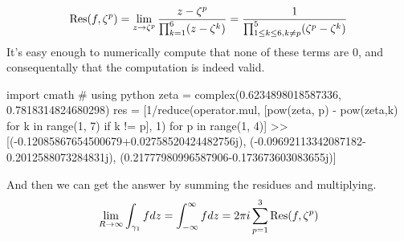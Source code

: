 \documentclass{homework}
\begin{document}
\begin{solution}
                                                                                                       \begin{align*}
                                                                                                           \operatorname{Res}(f, \zeta^p) = \lim_{z\to \zeta^p} \frac{z-\zeta^p}{\prod_{k=1}^6 (z-\zeta^k)} = \frac{1}{\prod_{1\leq k \leq 6, k\neq p}^5 (\zeta^p-\zeta^k)}
                                                                                                           \end{align*}
                                                                                                           It's easy enough to numerically compute that none of these terms are 0, and consequentally that the computation is indeed valid.
                                                                                                           \begin{code}
                                                                                                           import cmath # using python
                                                                                                           zeta = complex(0.6234898018587336, 0.7818314824680298)
                                                                                                           res = [1/reduce(operator.mul, [pow(zeta, p) - pow(zeta,k) for k in range(1, 7) if k != p], 1) for p in range(1, 4)]
                                                                                                           >> [(-0.12085867654500679+0.02758520424482756j), (-0.09692113342087182-0.2012588073284831j), (0.21777980996587906-0.173673603083655j)]
                                                                                                           \end{code}
                                                                                                           And then we can get the answer by summing the residues and multiplying.
                                                                                                           \[
                                                                                                           \lim_{R\to \infty} \int_{\gamma_1} fdz = \int_{-\infty}^{\infty} f dz = 2\pi i \sum_{p=1}^3{\operatorname{Res}(f, \zeta^p)}
                                                                                                           \]
                                                                                                           \begin{code}

\end{code}
\end{solution}
\end{document}
